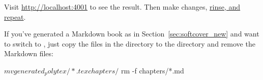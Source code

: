 \noindent Visit \href{http://localhost:4001}{http://localhost:4001} to see the result. Then make changes, \href{http://www.urbandictionary.com/define.php?term=rinse%20repeat}{rinse, and repeat}.


If you've generated a Markdown book as in Section~\ref{sec:softcover_new} and want to switch to \PolyTeX, just copy the files in the  directory to the  directory and remove the Markdown files:

\begin{code}
$ mv generated_polytex/*.tex chapters/
$ rm -f chapters/*.md
\end{code}


